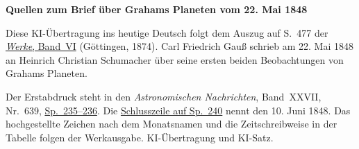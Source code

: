 \clearpage\thispagestyle{empty}
\begin{center}\textbf{Quellen zum Brief über Grahams Planeten vom 22. Mai 1848}\end{center}
\noindent Diese KI-Übertragung ins heutige Deutsch folgt dem Auszug auf S.~477 der \href{https://gdz.sub.uni-goettingen.de/id/PPN236007467}{\textit{Werke}, Band~VI} (Göttingen, 1874). Carl Friedrich Gauß schrieb am 22. Mai 1848 an Heinrich Christian Schumacher über seine ersten beiden Beobachtungen von Grahams Planeten.
\par\smallskip\noindent Der Erstabdruck steht in den \textit{Astronomischen Nachrichten}, Band~XXVII, Nr.~639, \href{https://api.digitale-sammlungen.de/iiif/image/v2/bsb10049452_00126/full/1800,/0/default.jpg}{Sp.~235--236}. Die \href{https://api.digitale-sammlungen.de/iiif/image/v2/bsb10049452_00128/full/1800,/0/default.jpg}{Schlusszeile auf Sp.~240} nennt den 10. Juni 1848. Das hochgestellte Zeichen nach dem Monatsnamen und die Zeitschreibweise in der Tabelle folgen der Werkausgabe. KI-Übertragung und KI-Satz.
\clearpage
